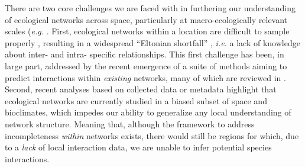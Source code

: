 There are two core challenges we are faced with in furthering our
understanding of ecological networks across space, particularly at
macro-ecologically relevant scales (\emph{e.g.} \cite{Trojelsgaard2016EcoNet}.
First, ecological networks within a location are difficult to sample
properly \cite{Jordano2016ChaEco, Jordano2016SamNet}, resulting in a
widespread ``Eltonian shortfall'' \cite{Hortal2015SevSho}, \emph{i.e.} a
lack of knowledge about inter- and intra- specific relationships. This
first challenge has been, in large part, addressed by the recent
emergence of a suite of methods aiming to predict interactions within
\emph{existing} networks, many of which are reviewed in
\cite{Strydom2021RoaPre}. Second, recent analyses based on collected data
\cite{Poisot2021GloKno} or metadata \cite{Cameron2019UneGlo} highlight
that ecological networks are currently studied in a biased subset of
space and bioclimates, which impedes our ability to generalize any local
understanding of network structure. Meaning that, although the framework
to address incompleteness \emph{within} networks exists, there would
still be regions for which, due to a \emph{lack} of local interaction
data, we are unable to infer potential species interactions.

